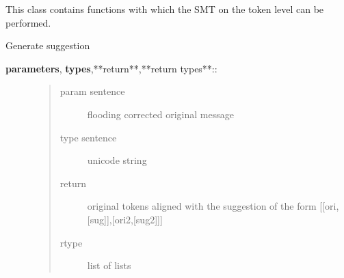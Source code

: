 \documentclass[letterpaper,10pt,english]{sphinxmanual}
\begin{document}
\begin{fulllineitems}
\label{API:norm.modules.smt.SMT_Token}
This class contains functions with which the SMT on the token level can be performed.

\begin{fulllineitems}
\label{API:norm.modules.smt.SMT_Token.generate_alternatives}
Generate suggestion
\begin{description}
\item[{\textbf{parameters}, \textbf{types},**return**,**return types**::}] \leavevmode\begin{quote}\begin{description}
\item[{param sentence}] \leavevmode
flooding corrected original message

\item[{type sentence}] \leavevmode
unicode string

\item[{return}] \leavevmode
original tokens aligned with the suggestion of the form {[}{[}ori,{[}sug{]}{]},{[}ori2,{[}sug2{]}{]}{]}

\item[{rtype}] \leavevmode
list of lists

\end{description}\end{quote}

\end{description}

\end{fulllineitems}


\end{fulllineitems}

\end{document}
